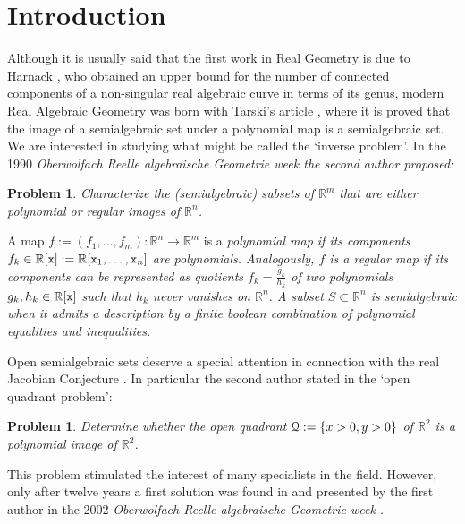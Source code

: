 \documentclass[10pt,twoside]{homg3} %
\newtheorem{prob}[thm]{Problem}
\newcommand{\Qq}{{\EuScript Q}}
\renewcommand{\R}{\mathbb{R}}
\begin{document}

\par
\bigskip

\section{Introduction}

Although it is usually said that the first work in Real Geometry is due to Harnack \cite{h}, who obtained an upper bound for the number of connected components of a non-singular real algebraic curve in terms of its genus, modern Real Algebraic Geometry was born with Tarski's article \cite{ta}, where it is proved that the image of a semialgebraic set under a polynomial map is a semialgebraic set. We are interested in studying what might be called the `inverse problem'. In the 1990 \em Oberwolfach Reelle algebraische Geometrie \em week \cite{g} the second author proposed: 

\begin{prob}\label{prob0}
Characterize the (semialgebraic) subsets of $\R^m$ that are either polynomial or regular images of $\R^n$. 
\end{prob}

A map $f:=(f_1,\ldots,f_m):\R^n\to\R^m$ is a \em polynomial map \em if its components $f_k\in\R[{\tt x}]:=\R[{\tt x}_1,\ldots,{\tt x}_n]$ are polynomials. Analogously, $f$ is a \em regular map \em if its components can be represented as quotients $f_k=\frac{g_k}{h_k}$ of two polynomials $g_k,h_k\in\R[{\tt x}]$ such that $h_k$ never vanishes on $\R^n$. A subset $S\subset\R^n$ is \em semialgebraic \em when it admits a description by a finite boolean combination of polynomial equalities and inequalities.

Open semialgebraic sets deserve a special attention in connection with the real Jacobian Conjecture \cite{p}. In particular the second author stated in \cite{g} the `open quadrant problem':

\begin{prob}\label{prob}
Determine whether the open quadrant $\Qq:=\{x>0,y>0\}$ of $\R^2$ is a polynomial image of $\R^2$.
\end{prob}

This problem stimulated the interest of many specialists in the field. However, only after twelve years a first solution was found in \cite{fg1} and presented by the first author in the 2002 \em Oberwolfach Reelle algebraische Geometrie \em week \cite{fe1}.
\end{document}
